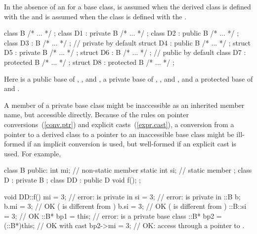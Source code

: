 \pnum
In the absence of an
for a base class,
is assumed when the derived class is
defined with the 
and
is assumed when the class is
defined with the 
.
\enterexample

\begin{codeblock}
class B { /* ... */ };
class D1 : private B { /* ... */ };
class D2 : public B { /* ... */ };
class D3 : B { /* ... */ };     //  private by default
struct D4 : public B { /* ... */ };
struct D5 : private B { /* ... */ };
struct D6 : B { /* ... */ };    //  public by default
class D7 : protected B { /* ... */ };
struct D8 : protected B { /* ... */ };
\end{codeblock}

Here
is a public base of
,
,
and
,
a private base of
,
,
and
,
and a protected base of
and
.
\exitexample

\pnum
\enternote
A member of a private base class might be inaccessible as an inherited
member name, but accessible directly.
Because of the rules on pointer conversions~(\ref{conv.ptr}) and explicit casts~(\ref{expr.cast}), a conversion from a pointer to a derived class to a pointer
to an inaccessible base class might be ill-formed if an implicit conversion
is used, but well-formed if an explicit cast is used.
For example,

\begin{codeblock}
class B {
public:
  int mi;                       // non-static member
  static int si;                // static member
};
class D : private B {
};
class DD : public D {
  void f();
};

void DD::f() {
  mi = 3;                       // error:  is private in 
  si = 3;                       // error:  is private in 
  ::B  b;
  b.mi = 3;                     // OK ( is different from )
  b.si = 3;                     // OK ( is different from )
  ::B::si = 3;                  // OK
  ::B* bp1 = this;              // error:  is a private base class
  ::B* bp2 = (::B*)this;        // OK with cast
  bp2->mi = 3;                  // OK: access through a pointer to .
}
\end{codeblock}
\exitnote

